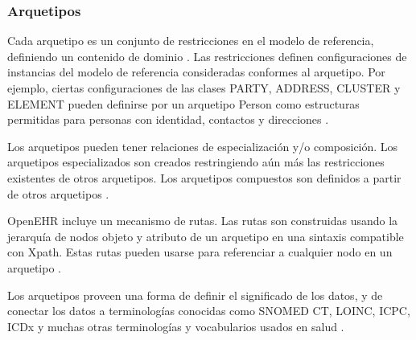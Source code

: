 \subsubsection{Arquetipos}

Cada arquetipo es un conjunto de restricciones en el modelo de referencia, definiendo un contenido de dominio \cite{openEHRArchitecture}. Las restricciones definen configuraciones de instancias del modelo de referencia consideradas conformes al arquetipo. Por ejemplo, ciertas configuraciones de las clases PARTY, ADDRESS, CLUSTER y ELEMENT pueden definirse por un arquetipo Person como estructuras permitidas para personas con identidad, contactos y direcciones \cite{openEHRAOM}.

Los arquetipos pueden tener relaciones de especialización y/o composición. Los arquetipos especializados son creados restringiendo aún más las restricciones existentes de otros arquetipos. Los arquetipos compuestos son definidos a partir de otros arquetipos \cite{openEHRArchitecture}.

OpenEHR incluye un mecanismo de rutas. Las rutas son construidas usando la jerarquía de nodos objeto y atributo de un arquetipo en una sintaxis compatible con Xpath. Estas rutas pueden usarse para referenciar a cualquier nodo en un arquetipo \cite{openEHRArchitecture}.

Los arquetipos proveen una forma de definir el significado de los datos, y de conectar los datos a terminologías conocidas como SNOMED CT, LOINC, ICPC, ICDx y muchas otras terminologías y vocabularios usados en salud \cite{openEHRArchitecture}.
